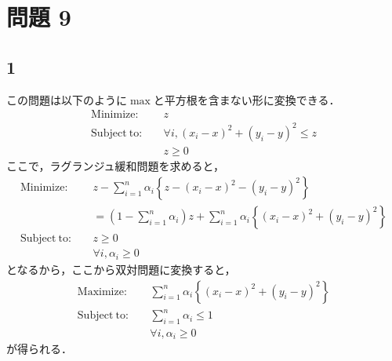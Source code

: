 \documentclass[a4paper,11pt]{jsarticle}
\begin{document}
\section*{問題 9}
\subsection*{1}
この問題は以下のように$\max$と平方根を含まない形に変換できる．
\begin{align*}
    \mathrm{Minimize:}    & \quad z                                           \\
    \mathrm{Subject\ to:} & \quad \forall i , (x_i - x)^2 + (y_i - y)^2 \le z \\
                          & \quad z \geq 0
\end{align*}
ここで，ラグランジュ緩和問題を求めると，
\begin{align*}
    \mathrm{Minimize:}    & \quad z - \sum_{i=1}^{n} \alpha_i \left\{
    z- (x_i - x)^2 - (y_i - y)^2 \right\}                                                                       \\
                          & \quad = \left(1 - \sum_{i=1}^{n}\alpha_i \right)z + \sum_{i=1}^{n} \alpha_i \left\{
    (x_i - x)^2 + (y_i - y)^2 \right\}
    \\
    \mathrm{Subject\ to:} & \quad z \geq 0                                                                      \\
                          & \quad \forall i , \alpha_i \geq 0
\end{align*}
となるから，ここから双対問題に変換すると，
\begin{align*}
    \mathrm{Maximize:}    & \quad \sum_{i=1}^{n} \alpha_i \left\{
    (x_i - x)^2 + (y_i - y)^2 \right\}                            \\
    \mathrm{Subject\ to:} & \quad  \sum_{i=1}^{n}\alpha_i  \leq 1 \\
                          & \quad \forall i , \alpha_i \geq 0
\end{align*}
が得られる．
\end{document}
